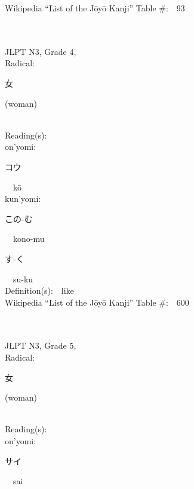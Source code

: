 \begin{multicols}{2}
Wikipedia ``List of the J\=oy\=o Kanji'' Table \#:\ \ 93 \\
\ \ \\
{\fontsize{34pt}{40pt}  }\ \ \\  %
{JLPT N3, Grade 4, \\Radical:\ \ {\begin{CJK}{UTF8}{min} 女 \end{CJK}} (woman) } \\
Reading(s):\ \ \\
{\hspace*{1em}}on'yomi:\ \ \\
{\hspace*{2em}}{\begin{CJK}{UTF8}{min} コウ \end{CJK}}\ \ k\=o\ \ \\
{\hspace*{1em}}kun'yomi:\ \ \\
{\hspace*{2em}}{\begin{CJK}{UTF8}{min} この-む \end{CJK}}\ \ kono-mu\ \ \\
{\hspace*{2em}}{\begin{CJK}{UTF8}{min} す-く \end{CJK}}\ \ su-ku\ \ \\
Definition(s):\ \ like \\
Wikipedia ``List of the J\=oy\=o Kanji'' Table \#:\ \ 600 \\
\ \ \\
{\fontsize{34pt}{40pt}  }\ \ \\  %
{JLPT N3, Grade 5, \\Radical:\ \ {\begin{CJK}{UTF8}{min} 女 \end{CJK}} (woman) } \\
Reading(s):\ \ \\
{\hspace*{1em}}on'yomi:\ \ \\
{\hspace*{2em}}{\begin{CJK}{UTF8}{min} サイ \end{CJK}}\ \ sai\ \ \\

\end{multicols}
